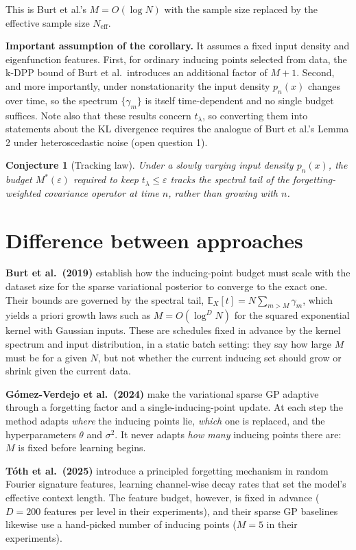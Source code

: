 \documentclass[11pt,a4paper]{article}
\newtheorem{conjecture}{Conjecture}
\theoremstyle{definition}
\theoremstyle{remark}
\newcommand{\Neff}{N_{\mathrm{eff}}}
\begin{document}
This is Burt et al.'s $M = O(\log N)$ with the sample size replaced by the effective sample size $\Neff$.

\textbf{Important assumption of the corollary.} It assumes a fixed input density and eigenfunction features. First, for ordinary inducing points selected from data, the k-DPP bound of Burt et al.\ introduces an additional factor of $M+1$. Second, and more importantly, under nonstationarity the input density $p_n(x)$ changes over time, so the spectrum $\{\gamma_m\}$ is itself time-dependent and no single budget suffices. Note also that these results concern $t_\lambda$, so converting them into statements about the KL divergence requires the analogue of Burt et al.'s Lemma 2 under heteroscedastic noise (open question 1).

\begin{conjecture}[Tracking law]
Under a slowly varying input density $p_n(x)$, the budget $M^*(\varepsilon)$ required to keep $t_\lambda \leq \varepsilon$ tracks the spectral tail of the forgetting-weighted covariance operator at time $n$, rather than growing with $n$.
\end{conjecture}

\section{Difference between approaches}

\textbf{Burt et al.\ (2019)} establish how the inducing-point budget must scale with the dataset size for the sparse variational posterior to converge to the exact one. Their bounds are governed by the spectral tail, $\mathbb{E}_X[t] = N\sum_{m>M}\gamma_m$, which yields a priori growth laws such as $M = O(\log^D N)$ for the squared exponential kernel with Gaussian inputs. These are schedules fixed in advance by the kernel spectrum and input distribution, in a static batch setting: they say how large $M$ must be for a given $N$, but not whether the current inducing set should grow or shrink given the current data.

\textbf{Gómez-Verdejo et al.\ (2024)} make the variational sparse GP adaptive through a forgetting factor and a single-inducing-point update. At each step the method adapts \emph{where} the inducing points lie, \emph{which} one is replaced, and the hyperparameters $\theta$ and $\sigma^2$. It never adapts \emph{how many} inducing points there are: $M$ is fixed before learning begins.

\textbf{Tóth et al.\ (2025)} introduce a principled forgetting mechanism in random Fourier signature features, learning channel-wise decay rates that set the model's effective context length. The feature budget, however, is fixed in advance ($D = 200$ features per level in their experiments), and their sparse GP baselines likewise use a hand-picked number of inducing points ($M = 5$ in their experiments).
\end{document}
